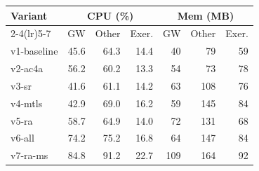 \begin{tabular}{lrrrrrr}
\toprule
Variant & \multicolumn{3}{c}{CPU (\%)} & \multicolumn{3}{c}{Mem (MB)} \\
\cmidrule(lr){2-4}\cmidrule(lr){5-7}
 & GW & Other & Exer. & GW & Other & Exer. \\
\midrule
v1-baseline & 45.6 & 64.3 & 14.4 & 40 & 79 & 59 \\
v2-ac4a & 56.2 & 60.2 & 13.3 & 54 & 73 & 78 \\
v3-sr & 41.6 & 61.1 & 14.2 & 63 & 108 & 76 \\
v4-mtls & 42.9 & 69.0 & 16.2 & 59 & 145 & 84 \\
v5-ra & 58.7 & 64.9 & 14.0 & 72 & 131 & 68 \\
v6-all & 74.2 & 75.2 & 16.8 & 64 & 147 & 84 \\
v7-ra-ms & 84.8 & 91.2 & 22.7 & 109 & 164 & 92 \\
\bottomrule
\end{tabular}
